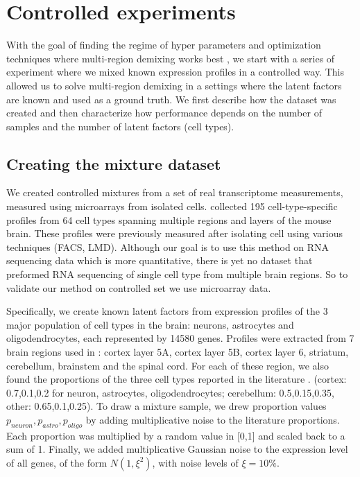 \documentclass{article} %
\begin{document}
\section{Controlled experiments}
\label{Synthetic_exp}
With the goal of finding the regime of hyper parameters and optimization techniques where multi-region demixing works best , we start with a series of experiment where we mixed known expression profiles in a controlled way. This allowed us to solve multi-region demixing in a settings where the latent factors are known and used as a ground truth. We first describe how the dataset was created and then characterize how performance depends on the number of samples and the number of latent factors (cell types).

\subsection{Creating the mixture dataset}
\vspace{-10pt}
We created controlled mixtures from a set of real transcriptome measurements, measured using microarrays from isolated cells. \citet{okaty2011cell} collected 195 cell-type-specific profiles from 64 cell types spanning multiple regions and layers of the mouse brain. These profiles were previously measured after isolating cell using various techniques (FACS, LMD). Although our goal is to use this method on RNA sequencing data which is more quantitative, there is yet no dataset that preformed RNA sequencing of single cell type from multiple brain regions. So to validate our method on controlled set we use microarray data.
 
Specifically, we create known latent factors from expression profiles of the 3 major population of cell types in the brain: neurons, astrocytes and oligodendrocytes, each represented by 14580 genes. Profiles were extracted from 7 brain regions used in \citet{doyle2008}:  cortex layer 5A, cortex layer 5B, cortex layer 6, striatum, cerebellum, brainstem and the spinal cord. For each of these region, we also found the proportions of the three cell types reported in the literature \cite{Herculano2014}. (cortex:  0.7,0.1,0.2 for neuron, astrocytes, oligodendrocytes; cerebellum: 0.5,0.15,0.35, other: 0.65,0.1,0.25). To draw a mixture sample, we drew proportion values $p_{neuron},p_{astro},p_{oligo}$ by adding multiplicative noise to the literature proportions. Each proportion was multiplied by a random value in [0,1] and scaled back to a  sum of 1. Finally, we added multiplicative Gaussian noise to the expression level of all genes, of the form $N(1,\xi^2)$, with noise levels of $\xi=10\%$.
\end{document}
